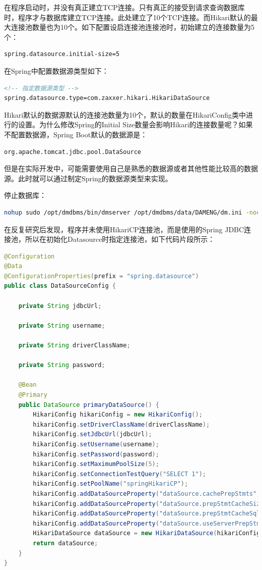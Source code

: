\documentclass[12pt]{book}
\numberwithin{dummy}{section}
\theoremstyle{ocrenumbox}
\theoremstyle{blacknumex}
\theoremstyle{blacknumbox}
\theoremstyle{ocrenum}
\begin{document}
在程序启动时，并没有真正建立TCP连接。只有真正的接受到请求查询数据库时，程序才与数据库建立TCP连接。此处建立了10个TCP连接。而Hikari默认的最大连接池数量也为10个。如下配置设启连接池连接池时，初始建立的连接数量为5个：

\begin{lstlisting}
spring.datasource.initial-size=5
\end{lstlisting}

在Spring中配置数据源类型如下：

\begin{lstlisting}[language=XML]
<!-- 指定数据源类型 -->
spring.datasource.type=com.zaxxer.hikari.HikariDataSource
\end{lstlisting}

Hikari默认的数据源默认的连接池数量为10个，默认的数量在HikariConfig类中进行的设置。为什么修改Spring的Initial Size数量会影响Hikari的连接数量呢？如果不配置数据源，Spring Boot默认的数据源是：

\begin{lstlisting}
org.apache.tomcat.jdbc.pool.DataSource
\end{lstlisting}

但是在实际开发中，可能需要使用自己是熟悉的数据源或者其他性能比较高的数据源。此时就可以通过制定Spring的数据源类型来实现。

停止数据库：

\begin{lstlisting}[language=Bash]
nohup sudo /opt/dmdbms/bin/dmserver /opt/dmdbms/data/DAMENG/dm.ini -noconsole &
\end{lstlisting}

在反复研究后发现，程序并未使用HikariCP连接池，而是使用的Spring JDBC连接池，所以在初始化Datasource时指定连接池，如下代码片段所示：

\begin{lstlisting}[language=Java]
@Configuration
@Data
@ConfigurationProperties(prefix = "spring.datasource")
public class DataSourceConfig {

	private String jdbcUrl;
	
	private String username;
	
	private String driverClassName;
	
	private String password;
	
	@Bean
	@Primary
	public DataSource primaryDataSource() {
		HikariConfig hikariConfig = new HikariConfig();
		hikariConfig.setDriverClassName(driverClassName);
		hikariConfig.setJdbcUrl(jdbcUrl);
		hikariConfig.setUsername(username);
		hikariConfig.setPassword(password);
		hikariConfig.setMaximumPoolSize(5);
		hikariConfig.setConnectionTestQuery("SELECT 1");
		hikariConfig.setPoolName("springHikariCP");
		hikariConfig.addDataSourceProperty("dataSource.cachePrepStmts", "true");
		hikariConfig.addDataSourceProperty("dataSource.prepStmtCacheSize", "250");
		hikariConfig.addDataSourceProperty("dataSource.prepStmtCacheSqlLimit", "2048");
		hikariConfig.addDataSourceProperty("dataSource.useServerPrepStmts", "true");
		HikariDataSource dataSource = new HikariDataSource(hikariConfig);
		return dataSource;
	}
}
\end{lstlisting}
\end{document}
